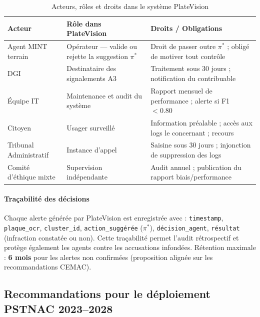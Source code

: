 \begin{table}[H]
\centering
\caption{Acteurs, r\^{o}les et droits dans le syst\`{e}me PlateVision}
\label{tab:d:gouvernance}
\begin{tabular}{p{3cm}p{4.5cm}p{5cm}}
\toprule
\textbf{Acteur} & \textbf{R\^{o}le dans PlateVision} & \textbf{Droits / Obligations} \\
\midrule
Agent MINT terrain
  & Op\'{e}rateur --- valide ou rejette la suggestion $\pi^*$
  & Droit de passer outre $\pi^*$ ; obligé de motiver tout contr\^{o}le \\
DGI
  & Destinataire des signalements A3
  & Traitement sous 30 jours ; notification du contribuable \\
\'{E}quipe IT
  & Maintenance et audit du syst\`{e}me
  & Rapport mensuel de performance ; alerte si F1 $< 0.80$ \\
Citoyen
  & Usager surveill\'{e}
  & Information pr\'{e}alable ; acc\`{e}s aux logs le concernant ; recours \\
Tribunal Administratif
  & Instance d'appel
  & Saisine sous 30 jours ; injonction de suppression des logs \\
Comit\'{e} d'\'{e}thique mixte
  & Supervision ind\'{e}pendante
  & Audit annuel ; publication du rapport biais/performance \\
\bottomrule
\end{tabular}
\end{table}

\paragraph{Tra\c{c}abilit\'{e} des d\'{e}cisions}
Chaque alerte g\'{e}n\'{e}r\'{e}e par PlateVision est enregistr\'{e}e avec :
\texttt{timestamp}, \texttt{plaque\_ocr}, \texttt{cluster\_id},
\texttt{action\_suggérée} ($\pi^*$), \texttt{décision\_agent},
\texttt{résultat} (infraction constat\'{e}e ou non).
Cette tra\c{c}abilit\'{e} permet l'audit r\'{e}trospectif et prot\`{e}ge
\'{e}galement les agents contre les accusations infond\'{e}es.
R\'{e}tention maximale : \textbf{6 mois} pour les alertes non confirm\'{e}es
(proposition align\'{e}e sur les recommandations CEMAC).

\subsection{Recommandations pour le d\'{e}ploiement PSTNAC 2023--2028}
\label{sec:d:recommandations}

